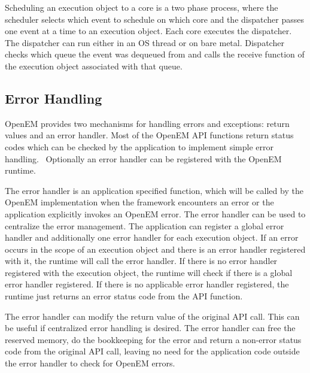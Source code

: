Scheduling an execution object to a core is a two phase process, where the scheduler selects which event to schedule on which core and the dispatcher passes one event at a time to an execution object. Each core executes the dispatcher. The dispatcher can run either in an OS thread or on bare metal. Dispatcher checks which queue the event was dequeued from and calls the receive function of the execution object associated with that queue.~\cite{openemintro}

\subsection{Error Handling}
\label{subsec:error}
OpenEM provides two mechanisms for handling errors and exceptions: return values and an error handler. Most of the OpenEM API functions return status codes which can be checked by the application to implement simple error handling.~\cite{openempage} Optionally an error handler can be registered with the OpenEM runtime.

The error handler is an application specified function, which will be called by the OpenEM implementation when the framework encounters an error or the application explicitly invokes an OpenEM error. The error handler can be used to centralize the error management. The application can register a global error handler and additionally one error handler for each execution object. If an error occurs in the scope of an execution object and there is an error handler registered with it, the runtime will call the error handler. If there is no error handler registered with the execution object, the runtime will check if there is a global error handler registered. If there is no applicable error handler registered, the runtime just returns an error status code from the API function.~\cite{openempage}

The error handler can modify the return value of the original API call. This can be useful if centralized error handling is desired. The error handler can free the reserved memory, do the bookkeeping for the error and return a non-error status code from the original API call, leaving no need for the application code outside the error handler to check for OpenEM errors.~\cite{openempage}

